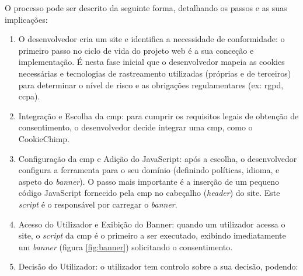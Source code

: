 \newpage

O processo pode ser descrito da seguinte forma, detalhando os passos e as suas implicações:

\begin{enumerate}
    \item O desenvolvedor cria um site e identifica a necessidade de conformidade: o primeiro passo no ciclo de vida do projeto web é a sua conceção e implementação. É nesta fase inicial que o desenvolvedor mapeia as cookies necessárias e tecnologias de rastreamento utilizadas (próprias e de terceiros) para determinar o nível de risco e as obrigações regulamentares (ex: \acrshort{rgpd}, \acrfull{ccpa}).
    \item Integração e Escolha da \acrshort{cmp}: para cumprir os requisitos legais de obtenção de consentimento, o desenvolvedor decide integrar uma \acrshort{cmp}, como o CookieChimp.
    \item Configuração da \acrshort{cmp} e Adição do JavaScript: após a escolha, o desenvolvedor configura a ferramenta para o seu domínio (definindo políticas, idioma, e aspeto do \textit{banner}). O passo mais importante é a inserção de um pequeno código JavaScript fornecido pela \acrshort{cmp} no cabeçalho (\textit{header}) do site. Este \textit{script} é o responsável por carregar o \textit{banner}.
    \item Acesso do Utilizador e Exibição do Banner: quando um utilizador acessa o site, o \textit{script} da \acrshort{cmp} é o primeiro a ser executado, exibindo imediatamente um \textit{banner} (figura \ref{fig:banner}) solicitando o consentimento.
    \item Decisão do Utilizador: o utilizador tem controlo sobre a sua decisão, podendo:


\end{enumerate}

